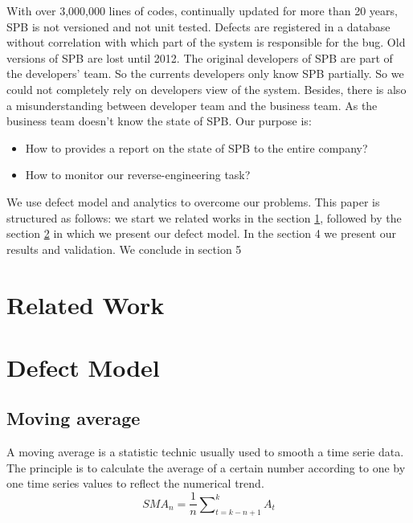 \documentclass[10pt,conference]{IEEEtran}
\begin{document}
With over 3,000,000 lines of codes, continually updated for more than 20 years,  SPB is not versioned and not unit tested. Defects  are registered in a database without correlation with which part of the system is responsible for the bug. Old versions of SPB are lost until 2012. The original developers of SPB are part of the developers' team. So the currents developers only know SPB partially.  So we could not completely rely on developers view of the system. Besides, there is also a misunderstanding between developer team and the business team. As the business team doesn't know the state of SPB.  Our purpose is:
\begin{itemize}
\item How to provides a report on the state of SPB to the entire company?
\item How to monitor our reverse-engineering task?
\end{itemize}
We use defect model and analytics to overcome our problems. This paper is structured as follows: we start we related works in the section \ref{sec:related-work}, followed by  the section \ref{sec:defectModel}  in which we present our defect model. In the section 4 we present our results and validation. We  conclude in section 5 
 

\section{Related Work}\label{sec:related-work}

\section{Defect Model}\label{sec:defectModel}
\subsection{Moving average}
A moving average is a statistic technic usually used to smooth a time serie data. The principle is to calculate the average of a certain number according to one by one time series values to reflect the numerical trend.
\begin{equation*} SMA_{n}=\frac{1}{n}\sum\nolimits_{t=k-n+1}^{k}A_{t}\tag{1} \end{equation*}
\end{document}
